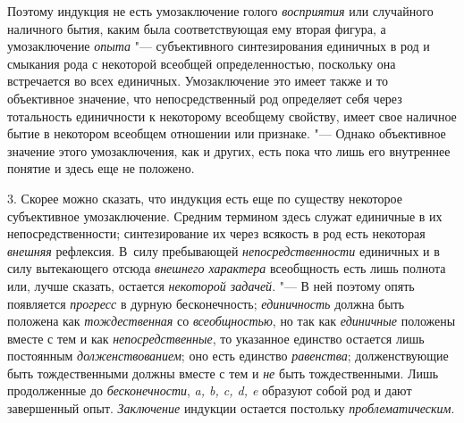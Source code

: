 Поэтому индукция не есть умозаключение голого
{\em восприятия} или
случайного наличного бытия, каким была соответствующая ему вторая фигура, а
умозаключение {\em опыта}
"--- субъективного синтезирования единичных в род и смыкания
рода с некоторой всеобщей определенностью, поскольку она встречается во
всех единичных. Умозаключение это имеет также и то объективное значение,
что непосредственный род определяет себя через тотальность единичности к
некоторому всеобщему свойству, имеет свое наличное бытие в некотором
всеобщем отношении или признаке. "--- Однако объективное
значение этого умозаключения, как и других, есть пока что лишь его
внутреннее понятие и здесь еще не положено.

3. Скорее можно сказать, что индукция есть еще по существу
некоторое субъективное умозаключение. Средним термином здесь служат
единичные в их непосредственности; синтезирование их через всякость в род
есть некоторая {\em внешняя}
рефлексия. В~силу пребывающей
{\em непосредственности}
единичных и в силу вытекающего отсюда
{\em внешнего характера}
всеобщность есть лишь полнота или, лучше
сказать, остается {\em некоторой
задачей}. "--- В ней поэтому опять появляется
{\em прогресс} в дурную
бесконечность; {\em единичность}
должна быть положена как
{\em тождественная} со
{\em всеобщностью}, но
так как {\em единичные}
положены вместе с тем и как
{\em непосредственные},
то указанное единство остается лишь постоянным
{\em долженствованием};
оно есть единство
{\em равенства};
долженствующие быть тождественными должны вместе с тем и
{\em не} быть
тождественными. Лишь продолженные до
{\em бесконечности},
{\em a, b, c, d, e} образуют собой род и
дают завершенный опыт. {\em Заключение}
индукции остается постольку
{\em проблематическим}.


